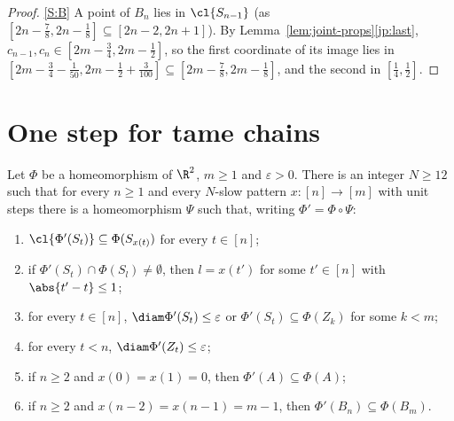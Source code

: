 \begin{proof}
\ref{S:B} A point of $B_n$ lies in $\cl{S_{n-1}}$ (as $[2n-\frac78,2n-\frac18]\subseteq[2n-2,2n+1]$).
By Lemma~\ref{lem:joint-props}\ref{jp:last}, $c_{n-1},c_n\in[2m-\frac34,2m-\frac12]$, so the first
coordinate of its image lies in $[2m-\frac34-\frac1{50},2m-\frac12+\frac3{100}]\subseteq
[2m-\frac78,2m-\frac18]$, and the second in $[\frac14,\frac12]$.
\end{proof}


\section{One step for tame chains}

\begin{proposition}\label{prop:real-step}
Let $\Phi$ be a homeomorphism of $\R^2$, $m\ge1$ and $\varepsilon>0$. There is an integer $N\ge12$
such that for every $n\ge1$ and every $N$-slow pattern $x\colon[n]\to[m]$ with unit steps there is a
homeomorphism $\Psi$ such that, writing $\Phi'=\Phi\circ\Psi$:
\begin{enumerate}[label=(R\arabic*)]
\item\label{R:follow} $\cl{\Phi'(S_t)}\subseteq\Phi(S_{x(t)})$ for every $t\in[n]$;
\item\label{R:tight} if $\Phi'(S_t)\cap\Phi(S_l)\neq\emptyset$, then $l=x(t')$ for some $t'\in[n]$ with
$\abs{t'-t}\le1$;
\item\label{R:small} for every $t\in[n]$, $\diam\Phi'(S_t)\le\varepsilon$ or $\Phi'(S_t)\subseteq\Phi(Z_k)$
for some $k<m$;
\item\label{R:zone} for every $t<n$, $\diam\Phi'(Z_t)\le\varepsilon$;
\item\label{R:A} if $n\ge2$ and $x(0)=x(1)=0$, then $\Phi'(A)\subseteq\Phi(A)$;
\item\label{R:B} if $n\ge2$ and $x(n-2)=x(n-1)=m-1$, then $\Phi'(B_n)\subseteq\Phi(B_m)$.
\end{enumerate}
\end{proposition}

